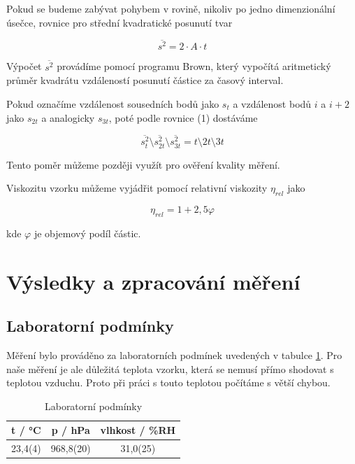 Pokud se budeme zabývat pohybem v rovině, nikoliv po jedno dimenzionální úsečce, rovnice pro střední kvadratické posunutí tvar

\begin{equation}
    \overline{s^2} = 2 \cdot A \cdot t
\end{equation}

Výpočet \(\overline{s^2}\) provádíme pomocí programu Brown, který vypočítá aritmetický průměr kvadrátu vzdáleností posunutí částice za časový interval.

Pokud označíme vzdálenost sousedních bodů jako \(s_t\) a vzdálenost bodů \(i\) a \(i + 2\) jako \(s_{2t}\) a analogicky \(s_{3t}\), poté podle rovnice (1) dostáváme

\begin{equation}
    \overline{s^2_{t}} \setminus \overline{s^2_{2t}} \setminus \overline{s^2_{3t}} = t \setminus 2t \setminus 3t
\end{equation}

Tento poměr můžeme později využít pro ověření kvality měření.

Viskozitu vzorku můžeme vyjádřit pomocí relativní viskozity \(\eta_{rel}\) jako

\begin{equation}
    \eta_{rel} = 1 + 2,5\varphi
\end{equation}

kde \(\varphi\) je objemový podíl částic.

\section{Výsledky a zpracování měření}

\subsection{Laboratorní podmínky}

    Měření bylo prováděno za laboratorních podmínek uvedených v tabulce \ref{tab:lab_pod}. Pro naše měření je ale důležitá teplota vzorku, která se nemusí přímo shodovat s teplotou vzduchu. Proto při práci s touto teplotou počítáme s větší chybou.

    \begin{table}[h]
        \centering
        \begin{tabular}{|c|c|c|} 
        \hline
            t / °C & p / hPa & vlhkost / \%RH  \\ 
        \hline
            23,4(4)   & 968,8(20)   & 31,0(25)            \\
        \hline
        \end{tabular}
        \caption{Laboratorní podmínky}
        \label{tab:lab_pod}
    \end{table}

